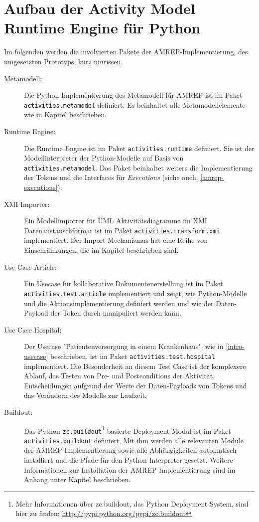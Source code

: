 \chapter{Aufbau der Activity Model Runtime Engine für Python}
Im folgenden werden die involvierten Pakete der AMREP-Implementierung, des umgesetzten Prototyps, kurz umrissen.

\begin{description}

\item[Metamodell:] Die Python Implementierung des Metamodell für AMREP ist im Paket \texttt{activities.metamodel} definiert. Es beinhaltet alle Metamodellelemente wie in Kapitel  beschrieben.

\item[Runtime Engine:] Die Runtime Engine ist im Paket \texttt{activities.runtime} definiert. Sie ist der Modellinterpreter der Python-Modelle auf Basis von \texttt{activities.metamodel}. Das Paket beinhaltet weiters die Implementierung der Tokens und die Interfaces für \emph{Executions} (siehe auch: \ref{amrep-executions}).

\item[XMI Importer:] Ein Modellimporter für UML Aktivitätsdiagramme im XMI Datenaustauschformat ist im Paket \texttt{activities.transform.xmi} implementiert. Der Import Mechanismus hat eine Reihe von Einschränkungen, die im Kapitel  beschrieben sind.

\item[Use Case Article:] Ein Usecase für kollaborative  Dokumentenerstellung ist im Paket \texttt{activities.test.article} implementiert und zeigt, wie Python-Modelle und die Aktionsimplementierung  definiert werden und wie der Daten-Payload der Token durch  manipuliert werden kann.

\item[Use Case Hospital:] Der Usecase "Patientenversorgung in einem Krankenhaus", wie in \ref{intro-usecase} beschrieben, ist im Paket \texttt{activities.test.hospital} implementiert. Die Besonderheit an diesem Test Case ist der komplexere Ablauf, das Testen von Pre- und Postconditions der Aktivität, Entscheidungen aufgrund der Werte der Daten-Payloads von Tokens und das Verändern des Modells zur Laufzeit.

\item[Buildout:] Das Python \texttt{zc.buildout}\footnote{Mehr Informationen über zc.buildout, das Python Deployment System, sind hier zu finden: \url{http://pypi.python.org/pypi/zc.buildout}}
basierte Deployment Modul ist im Paket \texttt{activities.buildout} definiert. Mit ihm werden alle relevanten Module der AMREP Implementierung sowie alle Abhängigkeiten automatisch installiert und die Pfade für den Python Interpreter gesetzt. Weitere Informationen zur Installation der AMREP Implementierung sind im Anhang unter Kapitel  beschrieben.

\end{description}


